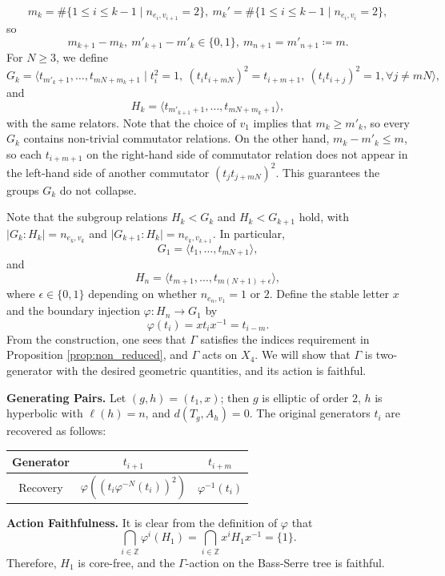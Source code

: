 \documentclass[12pt,leqno]{amsart}
\makeatletter
\renewenvironment{proof}[1][\proofname]{%
	\par
	\pushQED{\qed}%
	\normalfont
	\topsep6\p@\@plus6\p@\relax
	\trivlist
	\item[\hskip\labelsep\itshape #1\@addpunct{.}]%
	\ignorespaces
}{%
	\par\nobreak\vspace{2pt}%
	\popQED%
	\medskip%
	\endtrivlist
	\@endpefalse
}
\newcommand{\2}{L^2_{\rm per}(0, T)}
\numberwithin{equation}{section}
\numberwithin{figure}{section}
\makeatother
\begin{document}
\[
m_k = \#\{1\leq i\leq k-1\mid n_{e_i,v_{i+1}} = 2\},\ m_k' = \#\{1\leq i\leq k-1\mid n_{e_i,v_i} = 2\},
\]
so
\[
m_{k+1} - m_k,\ m'_{k+1}-m'_k\in\{0,1\},\ m_{n+1} = m'_{n+1}\coloneqq m.
\]
For $N\geq 3$, we define
\[
G_k = \langle t_{m'_k+1},\dots, t_{mN+m_k+1}\mid t_i^2=1,\ (t_it_{i+mN})^2 = t_{i+m+1},\ (t_it_{i+j})^2 = 1,\forall j\neq mN\rangle,
\]
and
\[
H_k = \langle t_{m'_{k+1}+1},\dots, t_{mN+m_k+1}\rangle,
\]
with the same relators. Note that the choice of $v_1$ implies that $m_k\geq m'_k$, so every $G_k$ contains non-trivial commutator relations. On the other hand, $m_k - m'_k\leq m$, so each $t_{i+m+1}$ on the right-hand side of commutator relation does not appear in the left-hand side of another commutator $(t_jt_{j+mN})^2$. This guarantees the groups $G_k$ do not collapse.

Note that the subgroup relations $H_k<G_k$ and $H_k<G_{k+1}$ hold, with $\lvert G_k:H_k\rvert = n_{e_k,v_k}$ and $\lvert G_{k+1}:H_k\rvert = n_{e_k,v_{k+1}}$. In particular,
\[
G_1 = \langle t_1,\dots, t_{mN+1}\rangle,
\]
and
\[
H_n = \langle t_{m+1},\dots, t_{m(N+1)+\epsilon}\rangle,
\]
where $\epsilon\in \{0,1\}$ depending on whether $n_{e_n,v_1} = 1$ or $2$. Define the stable letter $x$ and the boundary injection $\varphi: H_n\to G_1$ by
\[
    \varphi(t_{i}) = xt_ix^{-1} = t_{i-m}.
\]
From the construction, one sees that $\Gamma$ satisfies the indices requirement in Proposition \ref{prop:non_reduced}, and $\Gamma$ acts on $X_4$. We will show that $\Gamma$ is two-generator with the desired geometric quantities, and its action is faithful.
\begin{proof}
    \textbf{Generating Pairs.} Let $(g,h) = (t_1,x)$; then $g$ is elliptic of order $2$, $h$ is hyperbolic with $\ell(h) = n$, and $d(T_g,A_h) = 0$. The original generators $t_i$ are recovered as follows:
    \begin{center}
        \begin{tabular}{c||c|c}
            Generator & $t_{i+1}$ & $t_{i+m}$ \\
            \hline
            Recovery & $\varphi((t_i\varphi^{-N}(t_i))^2)$ & $\varphi^{-1}(t_i)$
        \end{tabular}
    \end{center}

    \textbf{Action Faithfulness.} It is clear from the definition of $\varphi$ that
    \[
    \bigcap_{i\in\mathbb{Z}}\varphi^i(H_1) = \bigcap_{i\in\mathbb{Z}} x^i H_1 x^{-1} = \{1\}.
    \]
    Therefore, $H_1$ is core-free, and the $\Gamma$-action on the Bass-Serre tree is faithful.
\end{proof}
\end{document}
